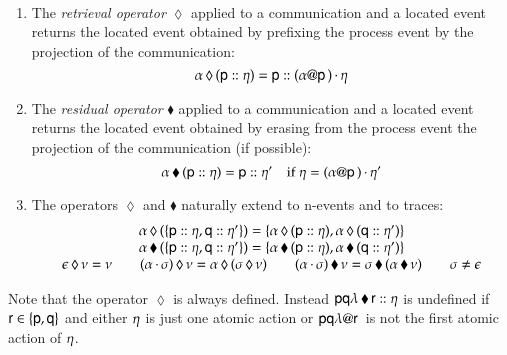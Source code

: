  
\begin{definition}\text{~}\\[-15pt]
\begin{enumerate}
\item{} The {\em retrieval operator} $\lozenge$ applied to a
  communication and a  located event  returns the located event
  obtained
  by  prefixing the process event by the projection of the communication:
\[
  {\alpha}\,\lozenge\,{({\sf p}:: \eta)}={\sf p}:: (\alpha @ {\sf p}\,)\,{\cdot}\,\eta
  \]
\item{} The {\em residual operator} $\blacklozenge$ applied to a
  communication and a located event returns the located event obtained
  by erasing
  from the process event the projection of the communication (if possible):
\[
  \postP{\locev{\pp}\event}\alpha=%
    \locev{\pp}{\event'}
      \quad
      \text{if }\event=
        \concat{(\projS{\alpha}{\pp})}{\event'}
        \]


  \item{} The operators $\lozenge$ and
    $\blacklozenge$ naturally extend to n-events  and to traces:
\[
\begin{array}{c}
 {\alpha}\,\lozenge\,{(\{{\sf p}:: \eta,{\sf q}:: \eta'\})}=
  \{{\alpha}\,\lozenge\,{({\sf p}:: \eta)},{\alpha}\,\lozenge\,{({\sf q}:: \eta')}\}
  \\
{\alpha}\,\blacklozenge\,{(\{{\sf p}:: \eta,{\sf q}:: \eta'\})}=
  \{{\alpha}\,\blacklozenge\,{({\sf p}:: \eta)},{\alpha}\,\blacklozenge\,{({\sf q}:: \eta')}\}
 \\
  {\epsilon}\,\lozenge\,{\nu}=\nu\qquad
  {(\ensuremath{\alpha\,{\cdot}\,\sigma})}\,\lozenge\,{\nu}={\alpha}\,\lozenge\,{({\sigma}\,\lozenge\,{\nu})}\qquad{(\ensuremath{\alpha\,{\cdot}\,\sigma})}\,\blacklozenge\,{\nu}={\sigma}\,\blacklozenge\,{({\alpha}\,\blacklozenge\,{\nu})} \qquad \sigma\not=\epsilon
  \end{array}
  \]
    \end{enumerate}
\end{definition}
\noindent
Note that the operator $\lozenge$ is always defined. Instead
${{\sf p}{\sf q}\lambda}\,\blacklozenge\,{{\sf r}:: \eta}$ is undefined if ${\sf r} \in
\{{\sf p},{\sf q}\}$ and either $\eta$ is just one atomic action or
${\sf p}{\sf q}\lambda @ {\sf r}\,$ is not the first atomic action of $\eta$.

